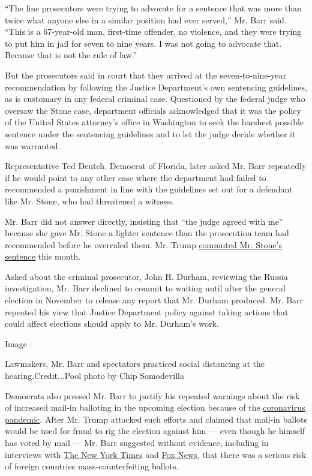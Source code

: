 ``The line prosecutors were trying to advocate for a sentence that was
more than twice what anyone else in a similar position had ever
served,'' Mr. Barr said. ``This is a 67-year-old man, first-time
offender, no violence, and they were trying to put him in jail for seven
to nine years. I was not going to advocate that. Because that is not the
rule of law.''

But the prosecutors said in court that they arrived at the
seven-to-nine-year recommendation by following the Justice Department's
own sentencing guidelines, as is customary in any federal criminal case.
Questioned by the federal judge who oversaw the Stone case, department
officials acknowledged that it was the policy of the United States
attorney's office in Washington to seek the harshest possible sentence
under the sentencing guidelines and to let the judge decide whether it
was warranted.

Representative Ted Deutch, Democrat of Florida, later asked Mr. Barr
repeatedly if he would point to any other case where the department had
failed to recommended a punishment in line with the guidelines set out
for a defendant like Mr. Stone, who had threatened a witness.

Mr. Barr did not answer directly, insisting that ``the judge agreed with
me'' because she gave Mr. Stone a lighter sentence than the prosecution
team had recommended before he overruled them. Mr. Trump
\href{https://www.nytimes3xbfgragh.onion/2020/07/10/us/politics/trump-roger-stone-clemency.html}{commuted
Mr. Stone's sentence} this month.

Asked about the criminal prosecutor, John H. Durham, reviewing the
Russia investigation, Mr. Barr declined to commit to waiting until after
the general election in November to release any report that Mr. Durham
produced. Mr. Barr repeated his view that Justice Department policy
against taking actions that could affect elections should apply to Mr.
Durham's work.

Image

Lawmakers, Mr. Barr and spectators practiced social distancing at the
hearing.Credit...Pool photo by Chip Somodevilla

Democrats also pressed Mr. Barr to justify his repeated warnings about
the risk of increased mail-in balloting in the upcoming election because
of the
\href{https://www.nytimes3xbfgragh.onion/interactive/2020/us/coronavirus-us-cases.html}{coronavirus
pandemic}. After Mr. Trump attacked such efforts and claimed that
mail-in ballots would be used for fraud to rig the election against him
--- even though he himself has voted by mail --- Mr. Barr suggested
without evidence, including in interviews with
\href{https://urldefense.proofpoint.com/v2/url?u=https-3A__www.nytimes.com_2020_06_01_magazine_william-2Dbarr-2Dattorney-2Dgeneral.html\&d=DwMFaQ\&c=jGUuvAdBXp_VqQ6t0yah2g\&r=bVVNPs8-wzWySU1LPjQH-giyvd3jgwNM5mI4gec0ZVgkgSksNhhps0rPEeN63Yaq\&m=Wj_rdThk_pA73T0byJFaMQwQ5zUDujOvP2xsA8g0eD0\&s=QDYgELfVpfZGzQjB_QxaqbPpm_pO8hwJpUsg1kpaEgg\&e=}{The
New York Times} and
\href{https://www.foxnews.com/transcript/exclusive-maria-bartiromo-interviews-ag-barr-on-police-reform-big-tech-censorship-durham-investigation}{Fox
News}, that there was a serious risk of foreign countries
mass-counterfeiting ballots.

